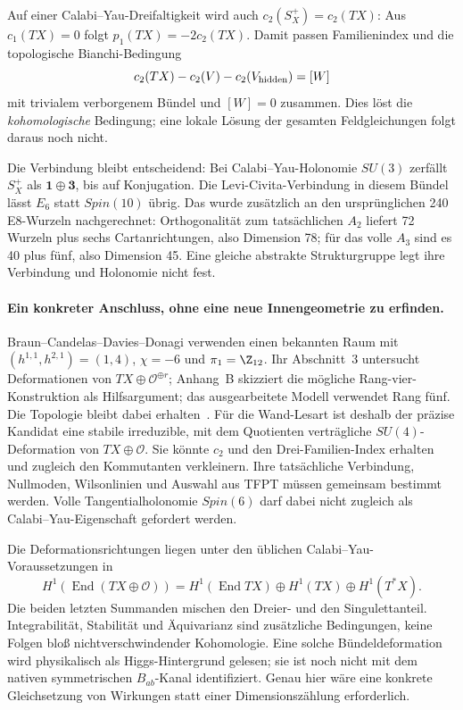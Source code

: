 Auf einer Calabi--Yau-Dreifaltigkeit wird auch $c_2(S_X^+)=c_2(TX)$: Aus $c_1(TX)=0$ folgt $p_1(TX)=-2c_2(TX)$. Damit passen Familienindex und die topologische Bianchi-Bedingung
\begin{equation}
c_2(TX)-c_2(V)-c_2(V_{\rm hidden})=[W]
\end{equation}
mit trivialem verborgenem Bündel und $[W]=0$ zusammen. Dies löst die \emph{kohomologische} Bedingung; eine lokale Lösung der gesamten Feldgleichungen folgt daraus noch nicht.

Die Verbindung bleibt entscheidend: Bei Calabi--Yau-Holonomie $SU(3)$ zerfällt $S_X^+$ als $\mathbf1\oplus\mathbf3$, bis auf Konjugation. Die Levi-Civita-Verbindung in diesem Bündel lässt $E_6$ statt $Spin(10)$ übrig. Das wurde zusätzlich an den ursprünglichen 240 E8-Wurzeln nachgerechnet: Orthogonalität zum tatsächlichen $A_2$ liefert 72 Wurzeln plus sechs Cartanrichtungen, also Dimension 78; für das volle $A_3$ sind es 40 plus fünf, also Dimension 45. Eine gleiche abstrakte Strukturgruppe legt ihre Verbindung und Holonomie nicht fest.

\paragraph{Ein konkreter Anschluss, ohne eine neue Innengeometrie zu erfinden.}
Braun--Candelas--Davies--Donagi verwenden einen bekannten Raum mit
$(h^{1,1},h^{2,1})=(1,4)$, $\chi=-6$ und $\pi_1=\Z_{12}$. Ihr Abschnitt~3 untersucht Deformationen von $TX\oplus\mathcal O^{\oplus r}$; Anhang~B skizziert die mögliche Rang-vier-Konstruktion als Hilfsargument; das ausgearbeitete Modell verwendet Rang fünf. Die Topologie bleibt dabei erhalten~\cite{braundeformation}. Für die Wand-Lesart ist deshalb der präzise Kandidat eine stabile irreduzible, mit dem Quotienten verträgliche $SU(4)$-Deformation von $TX\oplus\mathcal O$. Sie könnte $c_2$ und den Drei-Familien-Index erhalten und zugleich den Kommutanten verkleinern. Ihre tatsächliche Verbindung, Nullmoden, Wilsonlinien und Auswahl aus TFPT müssen gemeinsam bestimmt werden. Volle Tangentialholonomie $Spin(6)$ darf dabei nicht zugleich als Calabi--Yau-Eigenschaft gefordert werden.

Die Deformationsrichtungen liegen unter den üblichen Calabi--Yau-Voraussetzungen in
\begin{equation}
H^1(\operatorname{End}(TX\oplus\mathcal O))=
H^1(\operatorname{End}TX)\oplus H^1(TX)\oplus H^1(T^*X).
\end{equation}
Die beiden letzten Summanden mischen den Dreier- und den Singulettanteil. Integrabilität, Stabilität und Äquivarianz sind zusätzliche Bedingungen, keine Folgen bloß nichtverschwindender Kohomologie. Eine solche Bündeldeformation wird physikalisch als Higgs-Hintergrund gelesen; sie ist noch nicht mit dem nativen symmetrischen $B_{ab}$-Kanal identifiziert. Genau hier wäre eine konkrete Gleichsetzung von Wirkungen statt einer Dimensionszählung erforderlich.

